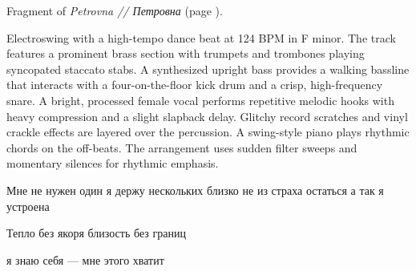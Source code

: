 
\begin{notes}
Fragment of \emph{Petrovna // Петровна} (page \pageref{sec:petrovna}).\\
\end{notes}
\begin{style}
Electroswing with a high-tempo dance beat at 124 BPM in F minor. The track features a prominent brass section with trumpets and trombones playing syncopated staccato stabs. A synthesized upright bass provides a walking bassline that interacts with a four-on-the-floor kick drum and a crisp, high-frequency snare. A bright, processed female vocal performs repetitive melodic hooks with heavy compression and a slight slapback delay. Glitchy record scratches and vinyl crackle effects are layered over the percussion. A swing-style piano plays rhythmic chords on the off-beats. The arrangement uses sudden filter sweeps and momentary silences for rhythmic emphasis.
\end{style}
\begin{lyrics}
Мне не нужен один
я держу нескольких близко
не из страха остаться
а так я устроена


Тепло без якоря
близость без границ

я знаю себя —
мне этого хватит
\end{lyrics}

